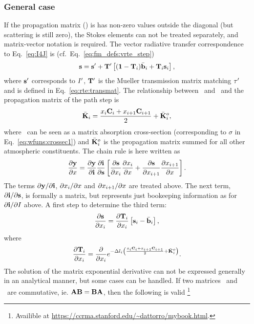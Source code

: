 \subsubsection{General case}
%
If the propagation matrix (\ExtMat) is has non-zero values outside the diagonal
(but scattering is still zero), the Stokes elements can not be treated
separately, and matrix-vector notation is required. The vector radiative
transfer correspondence to Eq.~\ref{eq:I4J} is
(cf.~Eq.~\ref{eq:fm_defs:vrte_step})
\begin{equation}
  \label{eq:s4J}
  {\bf s} = {\bf s}' + \mathbf{T}' \left[ (\mathbf{1}-\mathbf{T}_{i})\bar{{\bf b}}_i +
      \mathbf{T}_{i} {\bf s}_{i} \right],
\end{equation}
where ${\bf s}'$ corresponds to $I'$, $\mathbf{T}'$ is the Mueller
transmission matrix matching $\tau'$ and  is defined in
Eq.~\ref{eq:rte:transmat}. The relationship between \ and
\ and the propagation matrix of the path step is
\begin{equation}
  \bar{{\bf K}}_i = \frac{x_{i}\mathbf{C}_i+
                      x_{i+1}\mathbf{C}_{i+1}}{2} + \bar{{\bf K}}_i^o,
\end{equation}
where \ can be seen as a matrix absorption cross-section
(corresponding to $\sigma$ in Eq.~\ref{eq:wfuns:crossec1}) and
$\bar{{\bf K}}_i^o$ is the propagation matrix summed for all other atmospheric
constituents. 
The chain rule is here written as
\begin{equation}
  \label{eq:chainrule2}
  \frac{\partial\mathbf{y}}{\partial x} =  
  \frac{\partial\mathbf{y}}{\partial\mathbf{i}}
  \frac{\partial\mathbf{i}}{\partial{\bf s}} 
  \left[ \frac{\partial{\bf s}}{\partial x_{i}}
         \frac{\partial x_{i}}{\partial x} +
         \frac{\partial{\bf s}}{\partial x_{i+1}}
         \frac{\partial x_{i+1}}{\partial x} 
  \right].
\end{equation}
The terms $\partial\mathbf{y}/\partial\mathbf{i}$, $\partial x_{i}/\partial x$
and $\partial x_{i+1}/\partial x$ are treated above. The next term,
$\partial\mathbf{i}/\partial{\bf s}$, is formally a matrix, but represents just
bookeeping information as for $\partial\mathbf{i}/\partial I$ above. 
A first step to determine the third term:
\begin{equation}
  \frac{\partial{\bf s}}{\partial x_{i}} = 
  \frac{\partial\mathbf{T}_{i}}{\partial x_{i}}
   \left[ {\bf s}_{i}-\bar{{\bf b}}_i\right],
\end{equation}
where
\begin{equation}
  \frac{\partial\mathbf{T}_{i}}{\partial x_{i}} = 
  \frac{\partial}{\partial x_{i}} 
  e^{-\Delta l_{i}\left(\frac{x_{i}\mathbf{C}_i+
                      x_{i+1}\mathbf{C}_{i+1}}{2} + \bar{{\bf K}}_i^o  
  \right)}.
\end{equation}
The solution of the matrix exponential derivative can not be expressed
generally in an analytical manner, but some cases can be handled. If two
matrices \ and \ are commutative, ie. 
$\mathbf{A}\mathbf{B}=\mathbf{B}\mathbf{A}$, then the following is valid
\citep{Dattorro2011}\footnote{Availible at \url{https://ccrma.stanford.edu/~dattorro/mybook.html}.}

